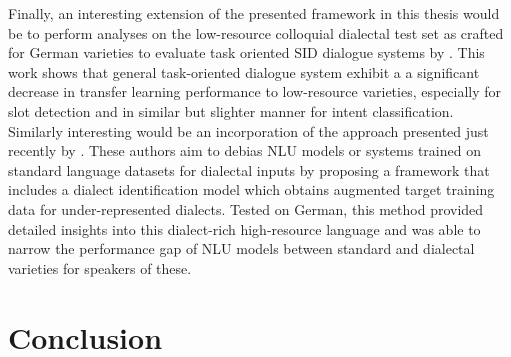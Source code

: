 \documentclass[11pt,a4paper,twoside,openright]{scrbook}
\begin{document}
Finally, an interesting extension of the presented framework in this thesis would be to perform analyses on the low-resource colloquial dialectal test set as crafted for German varieties to evaluate task oriented SID dialogue systems by \citet{artemova-etal-2024-exploring}. This work shows that general task-oriented dialogue system exhibit a a significant decrease in transfer learning performance to low-resource varieties, especially for slot detection and in similar but slighter manner for intent classification.
Similarly interesting would be an incorporation of the approach presented just recently by \citet{abboud-oz-2024-equitable}. These authors aim to debias NLU models or systems trained on standard language datasets for dialectal inputs by proposing a framework that includes a dialect identification model which obtains augmented target training data for under-represented dialects. Tested on German, this method provided detailed insights into this dialect-rich high-resource language and was able to narrow the performance gap of NLU models between standard and dialectal varieties for speakers of these. 









\chapter{Conclusion}
\end{document}

